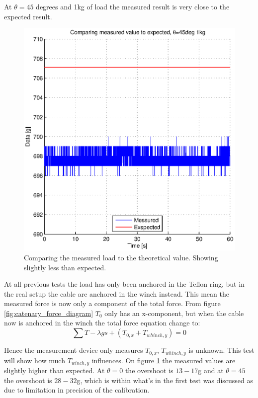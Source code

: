 At $\theta=45$ degrees and 1kg of load the measured result is very close to the expected result.

\begin{figure}[hbtp]
\centering
\includegraphics[scale=0.75]{graphics/gcs_test/45degTheta1kg.eps}
\caption[Comparing the measured load to the theoretical value]{Comparing the measured load to the theoretical value. Showing slightly less than expected.}
\label{fig:45degTheta1kg}
\end{figure}

\noindent
At all previous tests the load has only been anchored in the Teflon ring, but in the real setup the cable are anchored in the winch instead. This mean the measured force is now only a component of the total force. From figure \ref{fig:catenary_force_diagram} $T_0$ only has an x-component, but when the cable now is anchored in the winch the total force equation change to:
\begin{equation}
\sum T -\lambda gs + (T_{0,x} + T_{whinch,y} ) = 0
\end{equation}

\noindent
Hence the measurement device only measures $T_{0,x}$, $T_{whinch,y}$ is unknown. This test will show how much $T_{winch,y}$ influences.
On figure \ref{fig:45degTheta1kg} the measured values are slightly higher than expected. At $\theta = 0$ the overshoot is $13-17$g and at $\theta = 45$ the overshoot is $28-32$g, which is within what's in the first test was discussed as due to limitation in precision of the calibration. 

